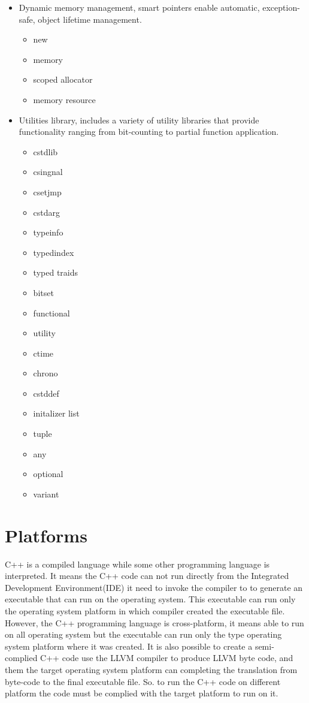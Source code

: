 \documentclass[12pt]{article}
\begin{document}
{\begin{enumerate}
\begin{itemize}
	\item Dynamic memory management, smart pointers enable automatic, exception-safe, object lifetime management.\cite{cppreferenceLib}
		\begin{itemize}
		\item new
		\item memory
		\item scoped allocator
		\item memory resource		
		\end{itemize}
		
	\item Utilities library, includes a variety of utility libraries that provide functionality ranging from bit-counting to partial function application.\cite{cppreferenceLib}
		\begin{itemize}
		\item cstdlib
		\item csingnal
		\item csetjmp
		\item cstdarg
		\item typeinfo
		\item typedindex
		\item typed traids
		\item bitset
		\item functional
		\item utility
		\item ctime
		\item chrono
		\item cstddef
		\item initalizer list
		\item tuple
		\item any
		\item optional
		\item variant
		\end{itemize}
		
	\end{itemize}
\end{enumerate}


\section{Platforms}
C++ is a compiled language while some other programming language is interpreted. It means the C++ code can not run directly from the Integrated Development Environment(IDE) it need to invoke the compiler to to generate an executable that can run on the operating system. This executable can run only the operating system platform in which compiler created the executable file. However, the C++ programming language is cross-platform, it means able to run on all operating system but the executable can run only the type operating system platform where it was created. It is also possible to create a semi-complied C++ code use the LLVM compiler to produce LLVM byte code, and them the target operating system platform can completing the translation from byte-code to the final executable file. So. to run the C++ code on different platform the code must be complied with the target platform to run on it. \cite{G2}\\ 

}
\end{document}
